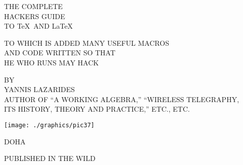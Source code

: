 \clearpage
\pagestyle{empty}
\begin{fullwidth}
\begin{center}
\bfseries

\nbvspace[1]
\Huge
{\nbtitlestretch\HUGE
THE COMPLETE \\ HACKERS
 GUIDE\\  TO \TeX\  AND \LaTeX\  \\
}

\nbvspace[1]
\normalsize
TO WHICH IS ADDED MANY USEFUL MACROS\\
AND CODE WRITTEN SO THAT\\
HE WHO RUNS MAY HACK

\nbvspace[1]
\small BY\\
\Large YANNIS LAZARIDES \\[0.5em]
\footnotesize AUTHOR OF ``A WORKING ALGEBRA,'' ``WIRELESS TELEGRAPHY,\\
ITS HISTORY, THEORY AND PRACTICE,'' ETC., ETC.

\nbvspace[2]

\texttt{[image: ./graphics/pic37]}

\nbvspace[3]
\normalsize
DOHA

\Large
PUBLISHED IN THE WILD
\nbvspace[1]
\end{center}
\pagestyle{fancy}
\end{fullwidth}
\eject
